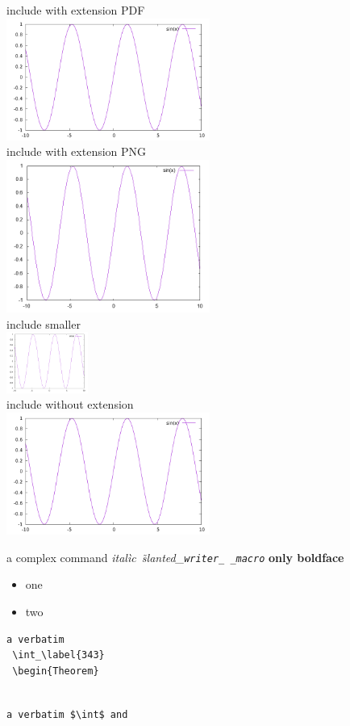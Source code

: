 \documentclass[a4paper]{article}
\newcounter{myCount}
\newtheorem{Theorem}%
[myCount]{Teorema}
\begin{document}
\begin{center}
  include with extension PDF
  \\
  \includegraphics[width=0.5\textwidth]{F/sin.pdf}
  \\
  include with extension PNG
  \\
  \includegraphics[width=0.5\textwidth]{F/sin.png}
  \\
  include smaller
  \\
  \includegraphics[width=0.2\textwidth]{F/sin.png}
  \\
  include without extension
  \\
  \includegraphics[width=0.5\textwidth]{F/sin}
\end{center}


a complex command
\emph{ital\`ic\textsl{~\~slanted\_\texttt{writer\_%
      \_macro}}}
\textbf{only boldface}

\begin{itemize}%


\item one
\item two
\end{itemize}


\begin{verbatim}
a verbatim
 \int_\label{343}
 \begin{Theorem}


\end{verbatim}

\verb=a verbatim $\int$ and  =

%

%
\end{document}
